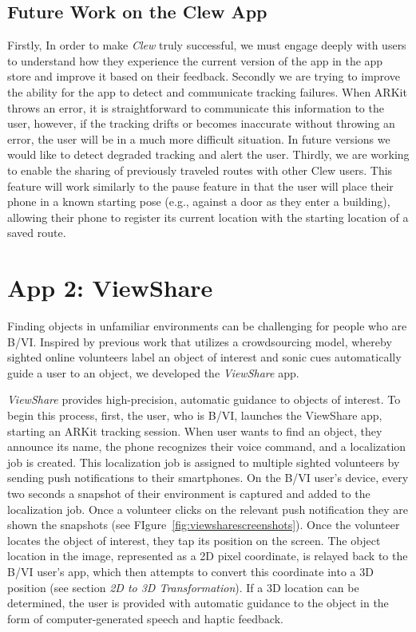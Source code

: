 \documentclass[chi_draft]{sigchi}
\newcommand{\BVI}{B/VI\xspace}
\begin{document}
\subsection{Future Work on the Clew App}
Firstly, In order to make \emph{Clew} truly successful, we must engage deeply with users to understand how they experience the current version of the app in the app store and improve it based on their feedback.  Secondly we are trying to improve the ability for the app to detect and communicate tracking failures.  When ARKit throws an error, it is straightforward to communicate this information to the user, however, if the tracking drifts or becomes inaccurate without throwing an error, the user will be in a much more difficult situation.  In future versions we would like to detect degraded tracking and alert the user.  Thirdly, we are working to enable the sharing of previously traveled routes with other Clew users.  This feature will work similarly to the pause feature in that the user will place their phone in a known starting pose (e.g., against a door as they enter a building), allowing their phone to register its current location with the starting location of a saved route.

\section{App 2: ViewShare}

Finding objects in unfamiliar environments can be challenging for people who are \BVI.  Inspired by previous work \cite{bigham2010vizwizlocateit} that utilizes a crowdsourcing model, whereby sighted online volunteers label an object of interest and sonic cues automatically guide a user to an object, we developed the \emph{ViewShare} app.

\emph{ViewShare} provides high-precision, automatic guidance to objects of interest.  To begin this process, first, the user, who is \BVI, launches the ViewShare app, starting an ARKit tracking session.  When  user wants to find an object, they announce its name, the phone recognizes their voice command, and a localization job is created.  This localization job is assigned to multiple sighted volunteers by sending push notifications to their smartphones.  On the \BVI user's device, every two seconds a snapshot of their environment is captured and added to the localization job.  Once a volunteer clicks on the relevant push notification they are shown the snapshots (see FIgure~\ref{fig:viewsharescreenshots}).  Once the volunteer locates the object of interest, they tap its position on the screen.  The object location in the image, represented as a 2D pixel coordinate, is relayed back to the \BVI user's app, which then attempts to convert this coordinate into a 3D position (see section \emph{2D to 3D Transformation}).  If a 3D location can be determined, the user is provided with automatic guidance to the object in the form of computer-generated speech and haptic feedback.
\end{document}
